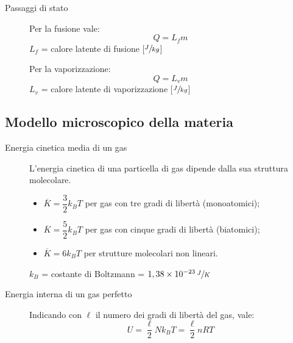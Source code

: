 \documentclass[a4paper,11pt,italian]{article}
\begin{document}
\begin{description}
  
  \item[Passaggi di stato] 
  Per la fusione vale:
  \[ Q = L_f m \]
  $ L_f $ = calore latente di fusione [$ \sfrac{J}{kg} $]
  
  Per la vaporizzazione:
  \[ Q = L_v m \]
  $ L_v $ = calore latente di vaporizzazione [$ \sfrac{J}{kg} $]
\end{description}

\subsection{Modello microscopico della materia}
\begin{description}
  \item[Energia cinetica media di un gas] 
  L'energia cinetica di una particella di gas dipende dalla sua struttura molecolare.
  \begin{itemize}
    \item $ \overline{K} = \dfrac{3}{2}k_B T $ per gas con tre gradi di libertà (monoatomici);
    \item $ \overline{K} = \dfrac{5}{2}k_B T $ per gas con cinque gradi di libertà (biatomici);
    \item $ \overline{K} = 6 k_B T $ per strutture molecolari non lineari.
  \end{itemize}
  $ k_B $ = costante di Boltzmann = $ 1,38 \times 10^{-23} \, \sfrac{J}{K} $

%   
  
  \item[Energia interna di un gas perfetto] 
  Indicando con $ \ell $ il numero dei gradi di libertà del gas, vale:
  \[ U = \frac{\ell}{2} N k_B T = \frac{\ell}{2} n R T  \]
\end{description}
\end{document}
